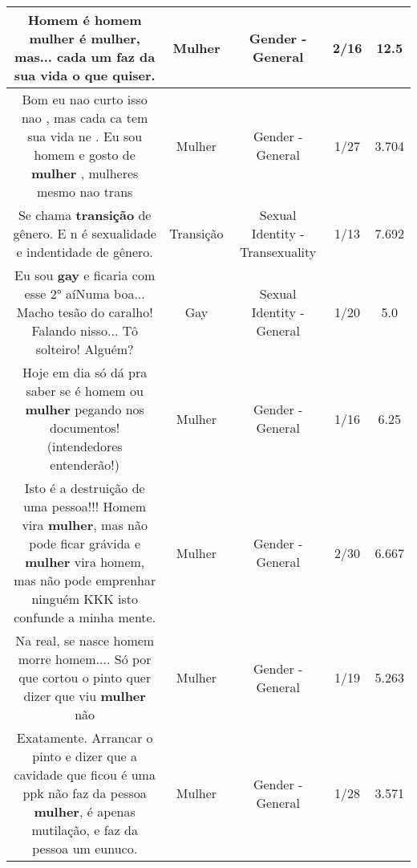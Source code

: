 \documentclass[11pt]{article}
\newlength\mylength
\begin{document}
\begin{center}
\begin{longtable}{|C{.65\mylength}|C{.30\mylength}|C{.12\mylength}|C{.12\mylength}|C{.12\mylength}|}
  \small Homem é homem \textbf{mulher} é \textbf{mulher}, mas... cada um faz da sua vida o que quiser.\normalsize   & Mulher & Gender - General & 2/16 & 12.5 \\  \hline
  \small Bom eu nao curto isso nao , mas cada ca tem sua vida ne . Eu sou homem e gosto de \textbf{mulher} , mulheres mesmo nao trans\normalsize   & Mulher & Gender - General & 1/27 & 3.704 \\  \hline
  \small Se chama \textbf{transição} de gênero. E n é sexualidade e indentidade de gênero.\normalsize   & Transição & Sexual Identity - Transexuality & 1/13 & 7.692 \\  \hline
  \small Eu sou \textbf{gay} e ficaria com esse 2° aíNuma boa... Macho tesão do caralho! Falando nisso... Tô solteiro! Alguém?\normalsize   & Gay & Sexual Identity - General & 1/20 & 5.0 \\  \hline
  \small Hoje em dia só dá pra saber se é homem ou \textbf{mulher} pegando nos documentos!(intendedores entenderão!)\normalsize   & Mulher & Gender - General & 1/16 & 6.25 \\  \hline
  \small Isto é a destruição de uma pessoa!!! Homem vira \textbf{mulher}, mas não pode ficar grávida e \textbf{mulher} vira homem, mas não pode emprenhar ninguém KKK isto confunde a minha mente.\normalsize   & Mulher & Gender - General & 2/30 & 6.667 \\  \hline
  \small Na real, se nasce homem morre homem.... Só por que cortou o pinto quer dizer que viu \textbf{mulher} não\normalsize   & Mulher & Gender - General & 1/19 & 5.263 \\  \hline
  \small Exatamente. Arrancar o pinto e dizer que a cavidade que ficou é uma ppk não faz da pessoa \textbf{mulher}, é apenas mutilação, e faz da pessoa um eunuco.\normalsize   & Mulher & Gender - General & 1/28 & 3.571 \\  \hline

\end{longtable}
\end{center}
\end{document}
